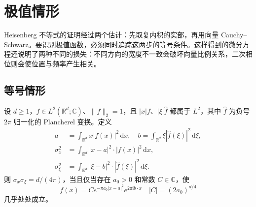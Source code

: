 \section{极值情形}
\label{b2:sec:2002}

Heisenberg 不等式的证明经过两个估计：先取复内积的实部，再用向量 Cauchy--Schwarz。要识别极值函数，必须同时追踪这两步的等号条件。这样得到的微分方程还说明了两种不同的损失：不同方向的宽度不一致会破坏向量比例关系，二次相位则会使位置与频率产生相关。

\subsection{等号情形}
\label{b2:subsec:200201}

\begin{proposition}\label{b2:thm:20-equality}
设 \(d\geq1\)，\(f\in L^2(\mathbb R^d;\mathbb C)\)、\(\|f\|_2=1\)，且 \(|x|f\)、\(|\xi|\widehat f\) 都属于 \(L^2\)，其中 \(\widehat f\) 为负号 \(2\pi\) 归一化的 Plancherel 变换。定义
\[
 \begin{aligned}
 a&=\int_{\mathbb R^d}x|f(x)|^2\,\mathrm dx,
 \quad
 b=\int_{\mathbb R^d}\xi|\widehat f(\xi)|^2\,\mathrm d\xi,\\
 \sigma_x^2&=\int_{\mathbb R^d}|x-a|^2\cdot|f(x)|^2\,\mathrm dx,\\
 \sigma_\xi^2&=\int_{\mathbb R^d}|\xi-b|^2\cdot
       |\widehat f(\xi)|^2\,\mathrm d\xi.
 \end{aligned}
\]
则 \(\sigma_x\sigma_\xi=d/(4\pi)\)，当且仅当存在 \(a_0>0\) 和常数 \(C\in\mathbb C\)，使
\[
 f(x)=C e^{-\pi a_0|x-a|^2}e^{2\pi\mathrm i b\cdot x}
 \quad
 |C|=(2a_0)^{d/4}
\]
几乎处处成立。
\end{proposition}
